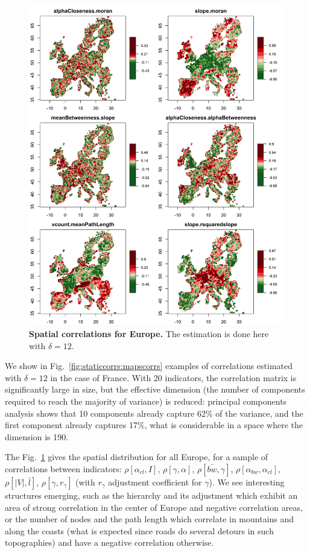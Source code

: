 \documentclass[11pt]{article}
\newcommand{\rhob}[2]{\ensuremath{\rho\!\left[#1,#2\right]}}
\begin{document}
\begin{figure}
	\includegraphics[width=\linewidth]{figures/A-staticcorrelations-europe-correlations.jpg}
\caption{\textbf{Spatial correlations for Europe.} The estimation is done here with $\delta = 12$.\label{fig:app:staticcorrelations:europe-correlations}}
\end{figure}



We show in Fig.~\ref{fig:staticcorrs:mapscorrs} examples of correlations estimated with $\delta = 12$ in the case of France. With 20 indicators, the correlation matrix is significantly large in size, but the effective dimension (the number of components required to reach the majority of variance) is reduced:  principal components analysis shows that 10 components already capture 62\% of the variance, and the first component already captures 17\%, what is considerable in a space where the dimension is 190.

The Fig.~\ref{fig:app:staticcorrelations:europe-correlations} gives the spatial distribution for all Europe, for a sample of correlations between indicators: $\rhob{\alpha_{cl}}{I}$, $\rhob{\gamma}{\alpha}$, $\rhob{\bar{bw}}{\gamma}$, $\rhob{\alpha_{bw}}{\alpha_{cl}}$, $\rhob{\left|V\right|}{\bar{l}}$, $\rhob{\gamma}{r_{\gamma}}$ (with $r_{\gamma}$ adjustment coefficient for $\gamma$). We see interesting structures emerging, such as the hierarchy and its adjustment which exhibit an area of strong correlation in the center of Europe and negative correlation areas, or the number of nodes and the path length which correlate in mountains and along the coasts (what is expected since roads do several detours in such topographies) and have a negative correlation otherwise.
\end{document}
